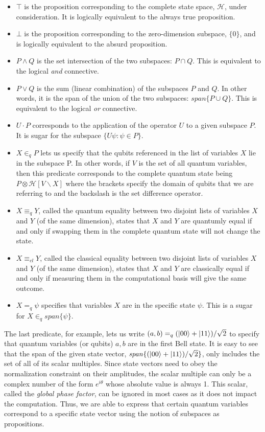 \documentclass[adraft,creativecommons]{eptcs}
\theoremstyle{definition}
\theoremstyle{remark}
\begin{document}
\begin{itemize}
	\item $\top$ is the proposition corresponding to the complete state space, $\mathcal{H}$, under consideration. It is logically equivalent to the always true proposition.
	\item $\bot$ is the proposition corresponding to the zero-dimension subspace, $\{0\}$, and is logically equivalent to the absurd proposition.
	\item $P \wedge Q$ is the set intersection of the two subspaces: $P \cap Q$. This is equivalent to the logical \textit{and} connective.
	\item $P \vee Q$ is the sum (linear combination) of the subspaces $P$ and $Q$. In other words, it is the span of the union of the two subspaces: $\mathit{span}\{P \cup Q\}$. This is equivalent to the logical \textit{or} connective.
	\item $U \cdot P$ corresponds to the application of the operator $U$ to a given subspace $P$. It is sugar for the subspace $\{U \psi: \psi \in P\}$.
	\item\label{itm:partnot} $X \in_q P$ lets us specify that the qubits referenced in the list of variables $X$ lie in the subspace P. In other words, if $V$ is the set of all quantum variables, then this predicate corresponds to the complete quantum state being $P \otimes \mathcal{H}[V \backslash X]$ where the brackets specify the domain of qubits that we are referring to and the backslash is the set difference operator.
	\item $X \equiv_q Y$, called the quantum equality between two disjoint lists of variables $X$ and $Y$ (of the same dimension), states that $X$ and $Y$ are quantumly equal if and only if swapping them in the complete quantum state will not change the state.
	\item $X \equiv_{cl} Y$, called the classical equality between two disjoint lists of variables $X$ and $Y$ (of the same dimension), states that $X$ and $Y$ are classically equal if and only if measuring them in the computational basis will give the same outcome.
	\item $X =_q \psi$ specifies that variables $X$ are in the specific state $\psi$. This is a sugar for $X \in_q \mathit{span}\{\psi\}$.
\end{itemize}

The last predicate, for example, lets us write $(a, b) =_q (\ket{00}+\ket{11})/\sqrt{2}$ to specify that quantum variables (or qubits) $a, b$ are in the first Bell state. It is easy to see that the span of the given state vector, $\mathit{span}\{(\ket{00}+\ket{11})/\sqrt{2}\}$, only includes the set of all of its scalar multiples. Since state vectors need to obey the normalization constraint on their amplitudes, the scalar multiple can only be a complex number of the form $e^{i\theta}$ whose absolute value is always 1. This scalar, called the \textit{global phase factor}, can be ignored in most cases as it does not impact the computation. Thus, we are able to express that certain quantum variables correspond to a specific state vector using the notion of subspaces as propositions.
\end{document}

